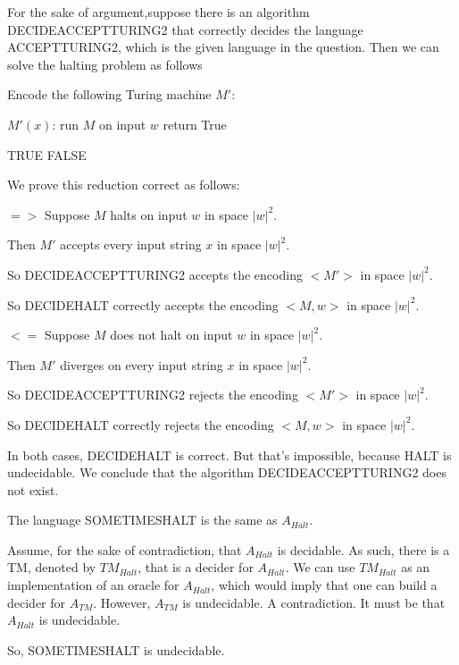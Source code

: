 \documentclass[12pt,a4paper]{article}
\newcommand{\question}[1]{\bigskip\noindent{\textbf{Q{#1} solution}}}
\begin{document}
For the sake of argument,suppose there is an algorithm DECIDEACCEPTTURING2 that correctly decides the language ACCEPTTURING2, which is the given language in the question. Then we can solve the halting problem as follows
\begin{algorithm}
	\begin{algorithmic}
		\State Encode the following Turing machine $M'$:

		\State $M'(x)$:
		\State run $M$ on input $w$
		\State return True
		
		\Return TRUE
		\Else{}
		\Return FALSE 
		\EndIf
		\EndFunction
	\end{algorithmic}
\end{algorithm}

We prove this reduction correct as follows:

$=>$ Suppose $M$ halts on input $w$ in space ${|w|}^2$.
     
	  Then $M'$ accepts every input string $x$ in space ${|w|}^2$.

	  So DECIDEACCEPTTURING2 accepts the encoding $<M'>$ in space ${|w|}^2$.

	  So DECIDEHALT correctly accepts the encoding $<M,w>$ in space ${|w|}^2$.


$<=$ Suppose $M$ does not halt on input $w$ in space ${|w|}^2$.

     Then $M'$ diverges on every input string $x$ in space ${|w|}^2$.

	 So DECIDEACCEPTTURING2 rejects the encoding $<M'>$ in space ${|w|}^2$.

	 So DECIDEHALT correctly rejects the encoding $<M,w>$ in space ${|w|}^2$.

In both cases, DECIDEHALT is correct. But that's impossible, because HALT is undecidable. We conclude that the algorithm DECIDEACCEPTTURING2 does not exist.

\question{36.A}

The language SOMETIMESHALT is the same as $A_{Halt}$.

Assume, for the sake of contradiction, that $A_{Halt}$ is decidable. As such, there is a TM, denoted by $TM_{Halt}$, that is a decider for $A_{Halt}$. We can use $TM_{Halt}$ as an implementation of an oracle for $A_{Halt}$, which would imply that one can build a decider for $A_{TM}$. However, $A_{TM}$ is undecidable. A contradiction. It must be that $A_{Halt}$ is undecidable.

So, SOMETIMESHALT is undecidable.
\end{document}
